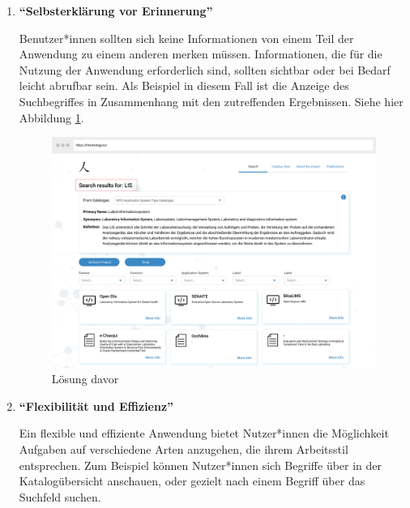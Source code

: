 \begin{enumerate}
\item \textbf{\enquote{Selbsterklärung vor Erinnerung}} \newline

Benutzer*innen sollten sich keine Informationen von einem Teil der Anwendung zu einem anderen merken müssen. 
Informationen, die für die Nutzung der Anwendung erforderlich sind, sollten sichtbar oder bei Bedarf leicht abrufbar sein.
Als Beispiel in diesem Fall ist die Anzeige des Suchbegriffes in Zusammenhang mit den zutreffenden Ergebnissen.
Siehe hier Abbildung \ref{fig:point6}.

\begin{figure}[H]
	\centering
    	\includegraphics[width=\textwidth]{Images/Mockup_Ergebnisseite_2}
   	\caption{Lösung davor}
   	\label{fig:point6}
\end{figure}

\item \textbf{\enquote{Flexibilität und Effizienz}} \newline

Ein flexible und effiziente Anwendung bietet Nutzer*innen die Möglichkeit Aufgaben auf verschiedene Arten anzugehen, die ihrem Arbeitsstil entsprechen.
Zum Beispiel können Nutzer*innen sich Begriffe über in der Katalogübersicht anschauen, oder gezielt nach einem Begriff über das Suchfeld suchen.


\end{enumerate}
